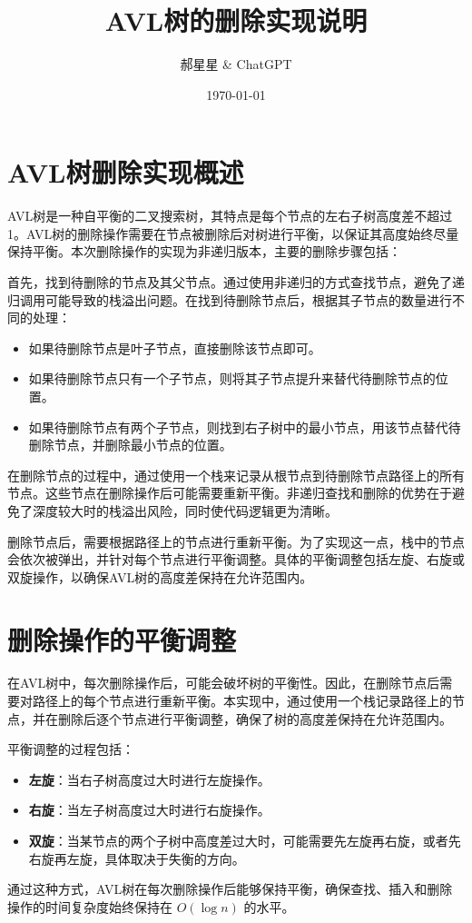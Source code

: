\documentclass[UTF8]{ctexart}
\title{AVL树的删除实现说明}
\author{郝星星 \& ChatGPT}
\date{\today}
\begin{document}
\maketitle

\section{AVL树删除实现概述}
AVL树是一种自平衡的二叉搜索树，其特点是每个节点的左右子树高度差不超过1。AVL树的删除操作需要在节点被删除后对树进行平衡，以保证其高度始终尽量保持平衡。本次删除操作的实现为非递归版本，主要的删除步骤包括：

首先，找到待删除的节点及其父节点。通过使用非递归的方式查找节点，避免了递归调用可能导致的栈溢出问题。在找到待删除节点后，根据其子节点的数量进行不同的处理：

\begin{itemize}
    \item 如果待删除节点是叶子节点，直接删除该节点即可。
    \item 如果待删除节点只有一个子节点，则将其子节点提升来替代待删除节点的位置。
    \item 如果待删除节点有两个子节点，则找到右子树中的最小节点，用该节点替代待删除节点，并删除最小节点的位置。
\end{itemize}

在删除节点的过程中，通过使用一个栈来记录从根节点到待删除节点路径上的所有节点。这些节点在删除操作后可能需要重新平衡。非递归查找和删除的优势在于避免了深度较大时的栈溢出风险，同时使代码逻辑更为清晰。

删除节点后，需要根据路径上的节点进行重新平衡。为了实现这一点，栈中的节点会依次被弹出，并针对每个节点进行平衡调整。具体的平衡调整包括左旋、右旋或双旋操作，以确保AVL树的高度差保持在允许范围内。

\section{删除操作的平衡调整}
在AVL树中，每次删除操作后，可能会破坏树的平衡性。因此，在删除节点后需要对路径上的每个节点进行重新平衡。本实现中，通过使用一个栈记录路径上的节点，并在删除后逐个节点进行平衡调整，确保了树的高度差保持在允许范围内。

平衡调整的过程包括：

\begin{itemize}
    \item \textbf{左旋}：当右子树高度过大时进行左旋操作。
    \item \textbf{右旋}：当左子树高度过大时进行右旋操作。
    \item \textbf{双旋}：当某节点的两个子树中高度差过大时，可能需要先左旋再右旋，或者先右旋再左旋，具体取决于失衡的方向。
\end{itemize}

通过这种方式，AVL树在每次删除操作后能够保持平衡，确保查找、插入和删除操作的时间复杂度始终保持在 $O(\log n)$ 的水平。
\end{document}

